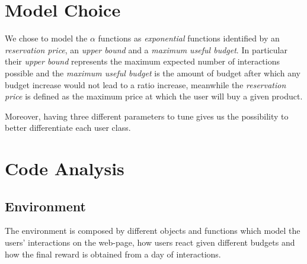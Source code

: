 \section{Model Choice}
\label{sec:env_Motivation}

We chose to model the $\alpha$ functions as \textit{exponential} functions identified by an \textit{reservation price}, an \textit{upper bound} and a \textit{maximum useful budget}. In particular their \textit{upper bound} represents the maximum expected number of interactions possible and the \textit{maximum useful budget} is the amount of budget after which any budget increase would not lead to a ratio increase, meanwhile the \textit{reservation price} is defined as the maximum price at which the user will buy a given product.

Moreover, having three different parameters to tune gives us the possibility to better differentiate each user class.

\section{Code Analysis}
\label{sec:env_Code Analysis}

\subsection{Environment}
The environment is composed by different objects and functions which model the users' interactions on the web-page, how users react given different budgets and how the final reward is obtained from a day of interactions.

